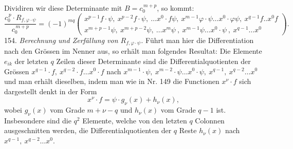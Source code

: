 Dividiren wir diese Determinante mit $B = c_0^{\,m+p}$, so kommt:
\[
\frac{c_0^{\,p}\cdot R_{f,\varphi\cdot\psi}}{c_0^{\,m+p}} =
(-1)^{mq}
\begin{pmatrix}
x^{p-1}f\cdot\psi,\ x^{p-2}f\cdot\psi,\ \ldots x^0\cdot f\psi,\ x^{m-1}\varphi\cdot\psi \ldots x^0\cdot\varphi\psi,\ x^{q-1}f..x^0f\\
x^{m+p-1}\psi,\ x^{m+p-2}\psi,\ \ldots x^m\psi\ ,\ x^{m-1}\psi \ldots x^0\cdot\psi\ ,\ x^{q-1}\ldots x^0
\end{pmatrix}.
\]
154. \textit{Berechnung und Zerf\"allung von $R_{f,\varphi\cdot\psi}$.} F\"uhrt man hier die Differentiation nach den Gr\"ossen im Nenner aus, so erh\"alt man folgendes Resultat:
Die Elemente $e_{ik}$ der letzten $q$ Zeilen dieser Determinante sind die Differentialquotienten der Gr\"ossen $x^{q-1}\cdot f,\ x^{q-2}\cdot f\ldots x^0\cdot f$ nach $x^{m-1}\cdot\psi,\ x^{m-2}\cdot\psi\ldots x^0\cdot\psi,\ x^{q-1},\ x^{q-2}\ldots x^0$ und man erh\"alt dieselben, indem man wie in Nr. 149 die Functionen $x^\nu\cdot f$ sich dargestellt denkt in der Form
\[
x^\nu\cdot f = \psi\cdot g_\nu(x) + h_\nu(x),
\]
wobei $g_\nu(x)$ vom Grade $m+\nu-q$ und $h_\nu(x)$ vom Grade $q-1$ ist. Insbesondere sind die $q^2$ Elemente, welche von den letzten $q$ Colonnen ausgeschnitten werden, die Differentialquotienten der $q$ Reste $h_\nu(x)$ nach $x^{q-1},\ x^{q-2}\ldots x^0$.

